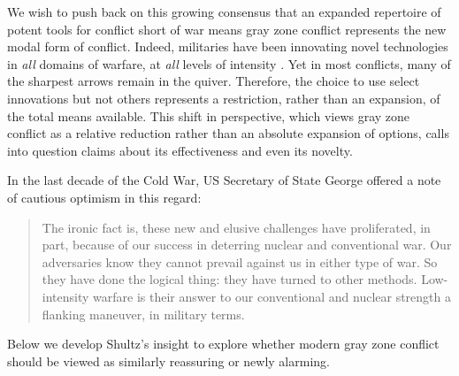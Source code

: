 \documentclass[11pt,letterpaper,pdftex,dvipsnames,table]{article}
\begin{document}

We wish to push back on this growing consensus that an expanded repertoire of potent tools for conflict short of war means gray zone conflict represents the new modal form of conflict. Indeed, militaries have been innovating novel technologies in \textit{all} domains of warfare, at \textit{all} levels of intensity \citep{gannon_oneifland_2022}. Yet in most conflicts, many of the sharpest arrows remain in the quiver. Therefore, the choice to use select innovations but not others represents a restriction, rather than an expansion, of the total means available. This shift in perspective, which views gray zone conflict as a relative reduction rather than an absolute expansion of options, calls into question claims about its effectiveness and even its novelty.

In the last decade of the Cold War, US Secretary of State George \citet[204]{shultz_lowintensitywarfarechallenge_1986} offered a note of cautious optimism in this regard:
    
    \begin{quote}
        The ironic fact is, these new and elusive challenges have proliferated, in part, because of our success in deterring nuclear and conventional war. Our adversaries know they cannot prevail against us in either type of war. So they have done the logical thing: they have turned to other methods. Low-intensity warfare is their answer to our conventional and nuclear strength a flanking maneuver, in military terms.
    \end{quote}
    
Below we develop Shultz's insight to explore whether modern gray zone conflict should be viewed as similarly reassuring or newly alarming. 
\end{document}
